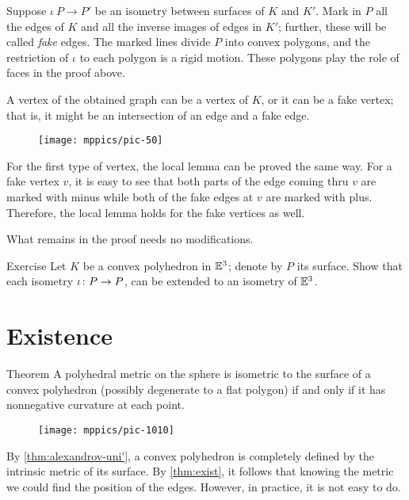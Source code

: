 Suppose $\iota\:P\to P'$ be an isometry between surfaces of $K$ and $K'$.
Mark in $P$ all the edges of $K$ and all the inverse images of edges in $K'$; further, these will be called \emph{fake} edges.
The marked lines divide $P$ into convex polygons, and the restriction of $\iota$ to each polygon is a rigid motion.
These polygons play the role of faces in the proof above.

A vertex of the obtained graph can be a vertex of $K$, or it can be a fake vertex;
that is, it might be an intersection of an edge and a fake edge.

\begin{figure}[ht!]
\vskip-0mm
\centering
\texttt{[image: mppics/pic-50]}
\vskip-0mm
\end{figure}

For the first type of vertex, the local lemma can be proved the same way. 
For a fake vertex $v$, it is easy to see that both parts of the edge coming thru $v$ are marked with minus
while both of the fake edges at $v$ are marked with plus.
Therefore, the local lemma holds for the fake vertices as well.

What remains in the proof needs no modifications.
\qeds

\begin{thm}{Exercise}\label{pr:K-P-simmetry}
Let $K$ be a convex polyhedron in $\mathbb{E}^3$;
denote by $P$ its surface.
Show that each isometry $\iota\:P\z\to P$,
can be extended to an isometry of $\mathbb{E}^3$. 
\end{thm}

\section{Existence}\label{sec:Alexandrov-existence}

\begin{thm}{Theorem}\label{thm:exist}
A polyhedral metric on the sphere is isometric to the surface of a convex polyhedron (possibly degenerate to a flat polygon) if and only if it has nonnegative curvature at each point.
\end{thm}

\begin{wrapfigure}{r}{30mm}
\vskip-5mm
\centering
\texttt{[image: mppics/pic-1010]}
\vskip-0mm
\end{wrapfigure}

By \ref{thm:alexandrov-uni'}, a convex polyhedron is completely defined by the intrinsic metric of its surface.
By \ref{thm:exist}, it follows that knowing the metric we could find the position of the edges.
However, in practice, it is not easy to do.

